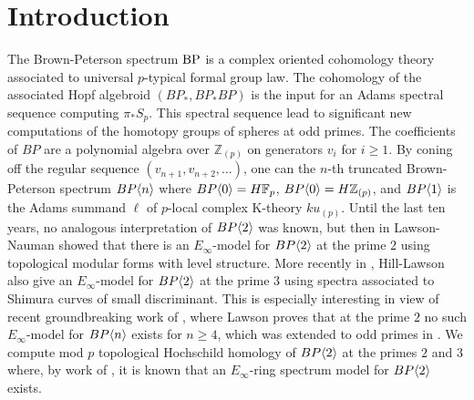 
\section{Introduction}
The Brown-Peterson spectrum $\mathrm{BP}$ is a complex oriented cohomology theory associated to universal $p$-typical formal group law. The cohomology of the associated Hopf algebroid $(BP_*,BP_*BP)$ is the input for an Adams spectral sequence computing $\pi_*S_p$. This spectral sequence lead to significant new computations of the homotopy groups of spheres at odd primes. The coefficients of $BP$ are a polynomial algebra over $\mathbb{Z}_{(p)}$ on generators $v_i$ for $i\ge 1$. By coning off the regular sequence $(v_{n+1},v_{n+2},\ldots )$, one can the $n$-th truncated Brown-Peterson spectrum $BP\langle n \rangle$ where $BP\langle 0 \rangle=H\mathbb{F}_p$, $BP\langle 0 \rangle=H\mathbb{Z}_{(p)}$, and $BP\langle 1 \rangle$ is the Adams summand $\ell$ of $p$-local complex K-theory $ku_{(p)}$. Until the last ten years, no analogous interpretation of $BP\langle 2 \rangle$ was known, but then in \cite{qx} Lawson-Nauman showed that there is an $E_{\infty}$-model for $BP\langle 2 \rangle$ at the prime $2$ using topological modular forms with level structure. More recently in \cite{qx}, Hill-Lawson also give an $E_{\infty}$-model for $BP\langle 2 \rangle$ at the prime $3$ using spectra associated to Shimura curves of small discriminant. This is especially interesting in view of recent groundbreaking work of \cite{qx}, where Lawson proves that at the prime $2$ no such $E_{\infty}$-model for $BP\langle n \rangle$ exists for $n\ge 4$, which was extended to odd primes in \cite{qx}. 
We compute mod $p$ topological Hochschild homology of $BP\langle 2 \rangle$ at the primes $2$ and $3$ where, by work of \cites{HillLawson,LawsonNaumann}, it is known that an $E_{\infty}$-ring spectrum model for $BP\langle 2 \rangle$ exists. 

